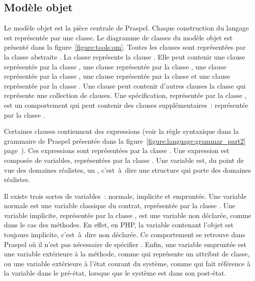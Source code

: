 \subsection{Modèle objet}
\label{subsection:tools:model}

\begin{sidewaysfigure}


\caption{\label{figure:tools:om} Modèle objet de Praspel.}

\end{sidewaysfigure}

Le modèle objet est la pièce centrale de Praspel. Chaque construction du langage
est représentée par une classe. Le diagramme de classes du modèle objet est
présenté dans la figure~\ref{figure:tools:om}. Toutes les clauses sont
représentées par la classe abstraite . La classe 
représente la clause \abehavior. Elle peut contenir une clause \arequires
représentée par la classe , une clause \aensures représentée par
la classe , une clause \athrowable représentée par la classe
, une clause \adescription représentée par la classe
 et une clause \adefault représentée par la classe
. Une clause \abehavior peut contenir d'autres clauses
\abehavior \via la classe  qui représente une collection de
clauses. Une spécification, représentée par la classe , est
un comportement qui peut contenir des clauses supplémentaires~: \ainvariant
représentée par la classe .

Certaines clauses contiennent des expressions (voir la règle syntaxique
 dans la grammaire de Praspel présentée dans la
figure~\ref{figure:language:grammar_part2}
page~\pageref{figure:language:grammar_part2}). Ces expressions sont représentées
par la classe . Une expression est composée de variables,
représentées par la classe . Une variable est, du point de vue
des domaines réalistes, un , c'est~à~dire une structure qui
porte des domaines réalistes.

Il existe trois sortes de variables~: normale, implicite et empruntée. Une
variable normale est une variable classique du contrat, représentée par la
classe . Une variable implicite, représentée par la classe
, est une variable non déclarée, comme  dans le cas
des méthodes. En effet, en PHP, la variable contenant l'objet est toujours
implicite, c'est~à~dire non déclarée. Ce comportement se retrouve dans Praspel
où il n'est pas nécessaire de spécifier . Enfin, une variable
empruntée est une variable extérieure à la méthode, comme  qui
représente un attribut de classe, ou une variable extérieure à l'état courant du
système, comme  qui fait référence à la variable  dans
le pré-état, lorsque que le système est dans son post-état.

